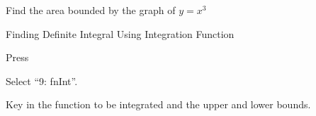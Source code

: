 \documentclass[11pt,a4paper]{book}
\begin{document}
Find the area bounded by the graph of $y=x^{3}$

\begin{GC}{Finding Definite Integral Using Integration Function}
\begin{steps}[leftmargin=1.5cm]

\item  Press \tcbox[box align=base,nobeforeafter,colback=black, colframe=black,size=small]{\textbf{\textcolor{white}{math}}}

\item  Select ``9: fnInt''.

\item  Key in the function to be integrated and the upper and lower
bounds.

\end{steps}
\end{GC}



\newpage
\end{document}

